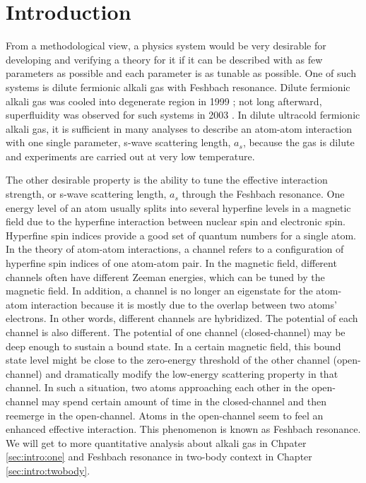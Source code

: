 
\chapter{Introduction}
From  a methodological view, a physics system  would be very desirable for developing and  verifying a theory for it if  it can be described with  as few parameters as possible and  each parameter  is as tunable as possible. One of such systems is dilute fermionic alkali gas with Feshbach resonance.  Dilute fermionic alkali gas was cooled into degenerate region in 1999 \cite{DeMarco1999}; not long afterward,  superfluidity was observed for such systems in 2003 \cite{Regal2003}.  In dilute ultracold fermionic alkali gas, it is sufficient in many analyses to describe an atom-atom interaction with one single parameter, s-wave scattering length, $a_{s}$, because the gas is dilute and experiments are carried out at very low temperature.       

The other desirable property is the ability to  tune the effective interaction strength, or s-wave scattering length, $a_{s}$ through the Feshbach resonance.  One energy level of an atom  usually splits into several hyperfine levels in a magnetic field  due to the hyperfine interaction between nuclear spin and electronic spin. Hyperfine spin indices provide a good set of quantum numbers for a single atom.  In the theory of  atom-atom interactions, a channel refers to a  configuration of hyperfine spin indices of one atom-atom pair. In the magnetic field, different channels often have different Zeeman energies, which can be tuned by the magnetic field.  In addition, a channel is no longer an eigenstate for the atom-atom interaction because it is mostly due to the overlap between two atoms' electrons.  In other words, different channels are hybridized.  The potential of each channel is also different.  The potential of one  channel (closed-channel) may be deep enough to sustain a bound state.  In a certain magnetic field,  this bound state level might be close to the zero-energy threshold of the other channel (open-channel) and  dramatically modify the low-energy scattering property in that channel.   In such a situation, two atoms approaching each other in the open-channel may spend certain amount of time in the closed-channel and then reemerge in the open-channel.  Atoms in the open-channel seem to feel an enhanced effective interaction.  This phenomenon is known as Feshbach resonance.    We will get to more quantitative analysis about alkali gas in Chpater \ref{sec:intro:one} and Feshbach resonance in two-body context in Chapter \ref{sec:intro:twobody}. 




